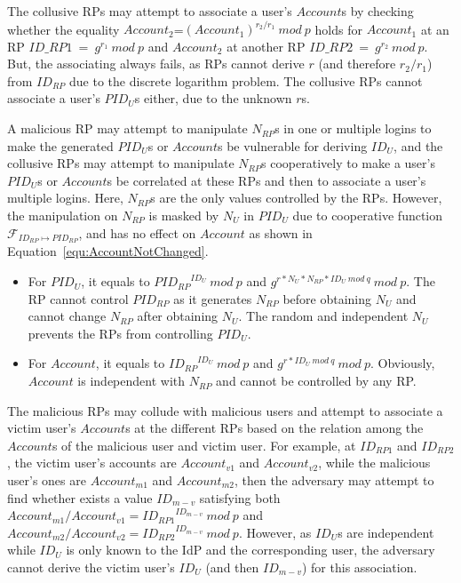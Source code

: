 The collusive RPs may attempt to associate  a user's $Account$s by checking whether the equality $Account_2$=$(Account_1)^{r_2/r_1}\ mod\ p$ holds for $Account_1$ at an RP $ID\_{RP1}\ =\ g^{r_1}\ mod\ p$ and $Account_2$ at another RP $ID\_{RP2}\ =\ g^{r_2}\ mod\ p$.
But, the associating always fails, as RPs cannot derive $r$ (and therefore ${r_2/r_1}$) from $ID_{RP}$ due to the discrete logarithm problem.
The collusive RPs cannot associate a user's  $PID_U$s either, due to the unknown $r$s.


A malicious RP may attempt to manipulate $N_{RP}$s in one or multiple logins to make the generated $PID_U$s or $Account$s be vulnerable for deriving $ID_U$,
 and the collusive RPs may attempt to manipulate $N_{RP}$s cooperatively to make a user's $PID_U$s or $Account$s be correlated at these RPs and then to associate a user's multiple logins.
Here, $N_{RP}$s are the only values controlled by the RPs.
However, the manipulation on $N_{RP}$ is masked by $N_U$ in $PID_U$ due to cooperative function $\mathcal{F}_{ID_{RP} \mapsto PID_{RP}}$,
 and has no effect on $Account$ as shown in Equation~\ref{equ:AccountNotChanged}.
\begin{itemize}
  \item For $PID_U$, it equals to ${PID_{RP}}^{ID_U}\ mod\ p$ and $g^{r*N_U*N_{RP}*ID_U\ mod\ q}\ mod\ p$. The RP cannot control $PID_{RP}$ as it generates $N_{RP}$ before obtaining $N_U$ and cannot change $N_{RP}$ after obtaining $N_U$. The random and independent $N_U$ prevents the RPs from controlling $PID_U$.
  \item For $Account$, it equals to ${ID_{RP}}^{ID_U}\ mod\ p$ and $g^{r*ID_U\ mod\ q}\ mod\ p$. Obviously, $Account$ is independent with $N_{RP}$ and cannot be controlled by any RP.
\end{itemize}

The malicious RPs may collude with  malicious users and attempt to associate a victim user's $Account$s  at the different RPs based on the relation among the $Account$s of the malicious user and victim user.
For example, at $ID_{RP1}$ and $ID_{RP2}$, the victim user's accounts are $Account_{v1}$ and $Account_{v2}$, while the malicious user's ones are $Account_{m1}$ and $Account_{m2}$, then the adversary may attempt to find whether exists a value $ID_{m-v}$ satisfying both $Account_{m1}/Account_{v1}={ID_{RP1}}^{ID_{m-v}}\ mod\ p$ and $Account_{m2}/Account_{v2}={ID_{RP2}}^{ID_{m-v}}\ mod\ p$.
However, as $ID_U$s are independent while $ID_U$ is only known to the IdP and the corresponding user,
the adversary cannot derive the victim user's $ID_U$ (and then $ID_{m-v}$) for this association.

